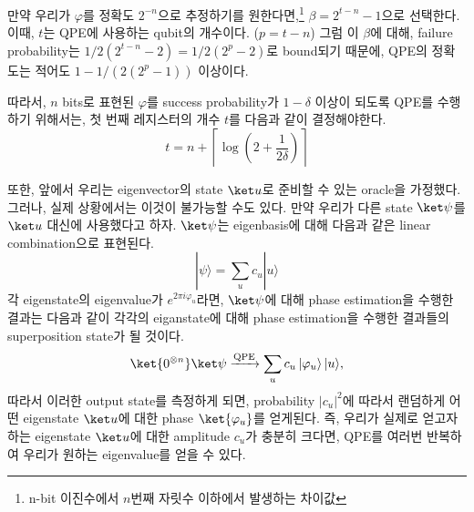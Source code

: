 만약 우리가 $\varphi$를 정확도 $2^{-n}$으로 추정하기를 원한다면,\footnote{n-bit 이진수에서 $n$번째 자릿수 이하에서 발생하는 차이값} $\beta = 2^{t-n}-1$으로 선택한다. 이때, $t$는 QPE에 사용하는 qubit의 개수이다. ($p=t-n$) 
그럼 이 $\beta$에 대해, failure probability는 $1/2(2^{t-n}-2) = 1/2(2^{p}-2)$로 bound되기 때문에, QPE의 정확도는 적어도 $1 - 1/(2(2^{p}-1))$ 이상이다. 

\vspace{1em}

따라서, $n$ bits로 표현된 $\varphi$를 success probability가 $1-\delta$ 이상이 되도록 QPE를 수행하기 위해서는, 첫 번째 레지스터의 개수 $t$를 다음과 같이 결정해야한다.
\begin{equation*}
  t = n + \left\lceil \log(2+\frac{1}{2\delta}) \right\rceil
\end{equation*}

또한, 앞에서 우리는 eigenvector의 state $\ket u$로 준비할 수 있는 oracle을 가정했다. 그러나, 실제 상황에서는 이것이 불가능할 수도 있다.
만약 우리가 다른 state $\ket \psi$를 $\ket u$ 대신에 사용했다고 하자. $\ket \psi$는 eigenbasis에 대해 다음과 같은 linear combination으로 표현된다.
\begin{equation*}
  |\psi\rangle=\sum_u c_u|u\rangle
\end{equation*}
각 eigenstate의 eigenvalue가 $e^{2\pi i \varphi_u}$라면, $\ket \psi$에 대해 phase estimation을 수행한 결과는 다음과 같이 각각의 eiganstate에 대해 phase estimation을 수행한 결과들의 superposition state가 될 것이다.
\begin{equation*}
  \ket{0^{\otimes n}} \ket \psi \xrightarrow{\text{QPE}} \sum_u c_u\left|\varphi_u\right\rangle|u\rangle,
\end{equation*}
따라서 이러한 output state를 측정하게 되면, probability $|c_u|^2$에 따라서 랜덤하게 어떤 eigenstate $\ket u$에 대한 phase $\ket {\varphi_u}$를 얻게된다. 즉, 우리가 실제로 얻고자하는 eigenstate $\ket u$에 대한 amplitude $c_u$가 충분히 크다면, QPE를 여러번 반복하여 우리가 원하는 eigenvalue를 얻을 수 있다.

